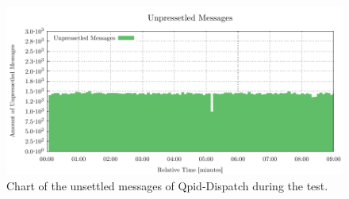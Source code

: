 \begin{figure}[H]
	\centering
	\includegraphics[width=1\linewidth]{obrazky-figures/charts/multipoint-router-only-throughput-routerLink.pdf}
	\caption{Chart of the unsettled messages of Qpid-Dispatch during the test.}
	\label{fig:router-multipoint-routerLink}
\end{figure}

